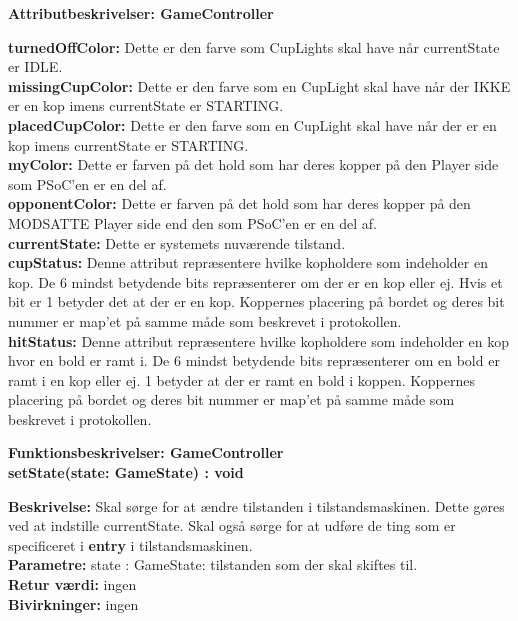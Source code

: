 \documentclass[Arkitektur/System_main.tex]{subfiles}
\begin{document}
{\large\textbf{Attributbeskrivelser: GameController}}
\begin{adjustwidth}{1cm}{0pt}
\textbf{turnedOffColor:} Dette er den farve som CupLights skal have når currentState er IDLE. \\[0.2cm]
\textbf{missingCupColor:} Dette er den farve som en CupLight skal have når der IKKE er en kop imens currentState er STARTING. \\[0.2cm]
\textbf{placedCupColor:} Dette er den farve som en CupLight skal have når der er en kop imens currentState er STARTING. \\[0.2cm]
\textbf{myColor:} Dette er farven på det hold som har deres kopper på den Player side som PSoC'en er en del af.\\[0.2cm]
\textbf{opponentColor:} Dette er farven på det hold som har deres kopper på den MODSATTE Player side end den som PSoC'en er en del af.\\[0.2cm]
\textbf{currentState:} Dette er systemets nuværende tilstand.\\[0.2cm]
\textbf{cupStatus:} Denne attribut repræsentere hvilke kopholdere som indeholder en kop. De 6 mindst betydende bits repræsenterer om der er en kop eller ej. Hvis et bit er 1 betyder det at der er en kop. Koppernes placering på bordet og deres bit nummer er map'et på samme måde som beskrevet i protokollen. \\[0.2cm] 
\textbf{hitStatus:} Denne attribut repræsentere hvilke kopholdere som indeholder en kop hvor en bold er ramt i. De 6 mindst betydende bits repræsenterer om en bold er ramt i en kop eller ej. 1 betyder at der er ramt en bold i koppen. Koppernes placering på bordet og deres bit nummer er map'et på samme måde som beskrevet i protokollen. \\[0.2cm]

\end{adjustwidth}


    {\large\textbf{Funktionsbeskrivelser: GameController}}\\[0.2cm]
    \textbf{setState(state: GameState) : void}
    \begin{adjustwidth}{1cm}{0pt}
    \textbf{Beskrivelse:} Skal sørge for at ændre tilstanden i tilstandsmaskinen. Dette gøres ved at indstille currentState. Skal også sørge for at udføre de ting som er specificeret i \textbf{entry} i tilstandsmaskinen. \\[0.2cm]
    \textbf{Parametre:} state : GameState: tilstanden som der skal skiftes til. \\[0.2cm]
    \textbf{Retur værdi:} ingen \\[0.2cm]
    \textbf{Bivirkninger:} ingen \\[0.2cm]
    \end{adjustwidth}
    
\end{document}
